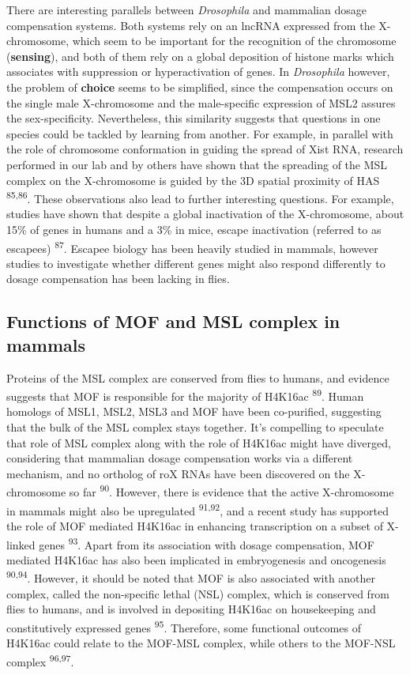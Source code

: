 \documentclass[11pt,twoside]{MPIthesis}
\theoremstyle{definition}
\theoremstyle{definition}
\theoremstyle{definition}
\theoremstyle{remark}
\begin{document}
There are interesting parallels between \emph{Drosophila} and mammalian
dosage compensation systems. Both systems rely on an lncRNA expressed
from the X-chromosome, which seem to be important for the recognition of
the chromosome (\textbf{sensing}), and both of them rely on a global
deposition of histone marks which associates with suppression or
hyperactivation of genes. In \emph{Drosophila} however, the problem of
\textbf{choice} seems to be simplified, since the compensation occurs on
the single male X-chromosome and the male-specific expression of MSL2
assures the sex-specificity. Nevertheless, this similarity suggests that
questions in one species could be tackled by learning from another. For
example, in parallel with the role of chromosome conformation in guiding
the spread of Xist RNA, research performed in our lab and by others have
shown that the spreading of the MSL complex on the X-chromosome is
guided by the 3D spatial proximity of HAS \textsuperscript{85,86}. These
observations also lead to further interesting questions. For example,
studies have shown that despite a global inactivation of the
X-chromosome, about 15\% of genes in humans and a 3\% in mice, escape
inactivation (referred to as escapees) \textsuperscript{87}. Escapee
biology has been heavily studied in mammals, however studies to
investigate whether different genes might also respond differently to
dosage compensation has been lacking in flies.

\subsection{Functions of MOF and MSL complex in
mammals}\label{functions-of-mof-and-msl-complex-in-mammals}

Proteins of the MSL complex are conserved from flies to humans, and
evidence suggests that MOF is responsible for the majority of H4K16ac
\textsuperscript{89}. Human homologs of MSL1, MSL2, MSL3 and MOF have
been co-purified, suggesting that the bulk of the MSL complex stays
together. It's compelling to speculate that role of MSL complex along
with the role of H4K16ac might have diverged, considering that mammalian
dosage compensation works via a different mechanism, and no ortholog of
roX RNAs have been discovered on the X-chromosome so far
\textsuperscript{90}. However, there is evidence that the active
X-chromosome in mammals might also be upregulated
\textsuperscript{91,92}, and a recent study has supported the role of
MOF mediated H4K16ac in enhancing transcription on a subset of X-linked
genes \textsuperscript{93}. Apart from its association with dosage
compensation, MOF mediated H4K16ac has also been implicated in
embryogenesis and oncogenesis \textsuperscript{90,94}. However, it
should be noted that MOF is also associated with another complex, called
the non-specific lethal (NSL) complex, which is conserved from flies to
humans, and is involved in depositing H4K16ac on housekeeping and
constitutively expressed genes \textsuperscript{95}. Therefore, some
functional outcomes of H4K16ac could relate to the MOF-MSL complex,
while others to the MOF-NSL complex \textsuperscript{96,97}.
\end{document}

